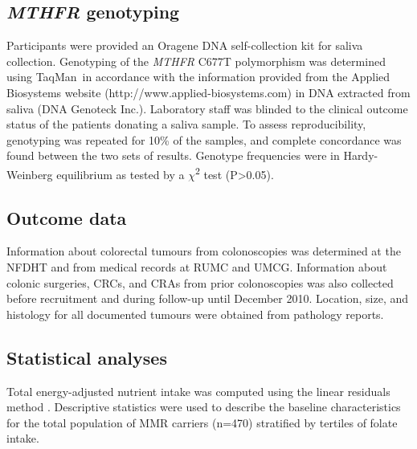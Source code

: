 \subsection{\emph{MTHFR} genotyping} %
\noindent Participants were provided an Oragene DNA self-collection kit for saliva collection. Genotyping of the \emph{MTHFR} C677T polymorphism was determined using TaqMan\textsuperscript{\textregistered}~in accordance with the information provided from the Applied Biosystems website (http://www.applied-biosystems.com) in DNA extracted from saliva (DNA Genoteck Inc.). Laboratory staff was blinded to the clinical outcome status of the patients donating a saliva sample. To assess reproducibility, genotyping was repeated for 10\% of the samples, and complete concordance was found between the two sets of results. Genotype frequencies were in Hardy-Weinberg equilibrium as tested by a $\chi$\textsuperscript{2} test (P>0.05).

\subsection{Outcome data} %
\noindent Information about colorectal tumours from colonoscopies was determined at the NFDHT \cite{c632} and from medical records at RUMC and UMCG. Information about colonic surgeries, CRCs, and CRAs from prior colonoscopies was also collected before recruitment and during follow-up until December 2010. Location, size, and histology for all documented tumours were obtained from pathology reports.

\subsection{Statistical analyses} %
\noindent Total energy-adjusted nutrient intake was computed using the linear residuals method \cite{c633}. Descriptive statistics were used to describe the baseline characteristics for the total population of MMR carriers (n=470) stratified by tertiles of folate intake.

